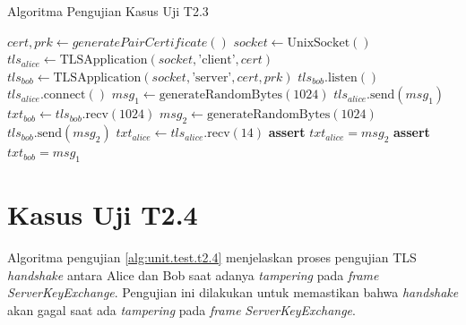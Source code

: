 \begin{algorithm}
  \caption{Algoritma Pengujian Kasus Uji T2.3}
  \label{alg:unit.test.t2.3}
  \begin{algorithmic}
    \State $cert, prk \gets generatePairCertificate()$
    \State $socket \gets \text{UnixSocket}()$ 
    \State $tls_{alice} \gets \text{TLSApplication}(socket, \text{'client'}, cert)$ 
    \State $tls_{bob} \gets \text{TLSApplication}(socket, \text{'server'}, cert, prk)$
    \State
    \State $tls_{bob}.\text{listen}()$  
    \State $tls_{alice}.\text{connect}()$  
    \State
    \State $msg_1 \gets \text{generateRandomBytes}(1024)$
    \State $tls_{alice}.\text{send}(msg_1)$
    \State $txt_{bob} \gets tls_{bob}.\text{recv}(1024)$
    \State
    \State $msg_2 \gets \text{generateRandomBytes}(1024)$
    \State $tls_{bob}.\text{send}(msg_2)$
    \State $txt_{alice} \gets tls_{alice}.\text{recv}(14)$
    \State
    \State \textbf{assert} $txt_{alice} = msg_2$
    \State \textbf{assert} $txt_{bob} = msg_1$
  \end{algorithmic}
\end{algorithm}

\section{Kasus Uji T2.4}

Algoritma pengujian \ref{alg:unit.test.t2.4} menjelaskan proses pengujian TLS \emph{handshake} antara Alice dan Bob saat adanya \emph{tampering} pada \emph{frame} \emph{ServerKeyExchange}. Pengujian ini dilakukan untuk memastikan bahwa \emph{handshake} akan gagal saat ada \emph{tampering} pada \emph{frame} \emph{ServerKeyExchange}. 

